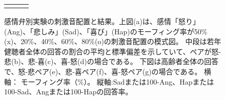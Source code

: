 \begin{figure}[t]
\begin{tabular}{ccc}
  \begin{minipage} {0.31\hsize}
  \centering
  \includegraphics [ width = 1\columnwidth]{Figure/ExpAngHapSad/Fig1f_Eld_Raw_AllSbj_hap-sad.eps }
  \label{fig:Eld _ExpEmoWHIS_hap-sad }
  \end{minipage} &
  
  \begin{minipage} {0.31\hsize}
  \centering
  \includegraphics [ width = 1\columnwidth]{Figure/ExpAngHapSad/Fig1g_Eld_Raw_AllSbj_ang-hap.eps }
  \label{fig:Eld_ExpEmoWHIS_ang-hap }
  \end{minipage}
  
  \end{tabular}
  
  \vspace {-6pt}
  \caption{感情弁別実験の刺激音配置と結果。上図(a)は、感情「怒り」(Ang)、「悲しみ」(Sad)、「喜び」(Hap)のモーフィング率が50\%(x)、20\%、40\%、60\%、80\%(o)の刺激音配置の模式図。
            中段は若年健聴者全体の回答の割合の平均と標準偏差を示していて、ペアが怒-悲(b)、悲-喜(c)、喜-怒(d)の場合である。
            下図は高齢者全体の回答で、怒-悲ペア(e)、悲-喜ペア(f)、喜-怒ペア(g)の場合である。
            横軸： モーフィング率（\%）。 縦軸:Sadまたは100-Ang、Hapまたは100-Sad、Angまたは100-Hapの回答率。}
  
  \label{fig:ExpRsltEmoPercent}

  \vspace {-12pt}
  \end{figure}


